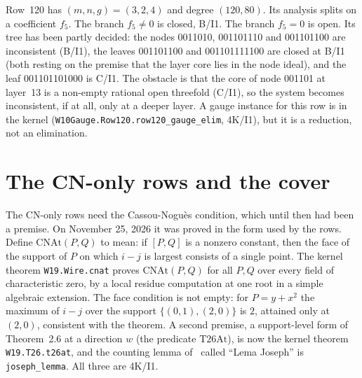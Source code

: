 \documentclass[a4paper,11pt]{article}
\theoremstyle{jsplain}
\theoremstyle{jsdef}
\theoremstyle{jsrem}
\begin{document}
Row~120 has $(m,n,g)=(3,2,4)$ and degree $(120,80)$. Its analysis splits on a coefficient $f_5$. The branch $f_5\ne0$ is closed, B/I1. The branch $f_5=0$ is open. Its tree has been partly decided: the nodes 0011010, 001101110 and 001101100 are inconsistent (B/I1), the leaves 001101100 and 001101111100 are closed at B/I1 (both resting on the premise that the layer core lies in the node ideal), and the leaf 001101101000 is C/I1. The obstacle is that the core of node 001101 at layer~13 is a non-empty rational open threefold (C/I1), so the system becomes inconsistent, if at all, only at a deeper layer. A gauge instance for this row is in the kernel (\texttt{W10Gauge.\allowbreak{}Row120.\allowbreak{}row120\_\allowbreak{}gauge\_\allowbreak{}elim}, 4K/I1), but it is a reduction, not an elimination.

\section{The CN-only rows and the cover}\label{rp:sec:w19}

The CN-only rows need the Cassou-Nogu\`es condition, which until then had been a premise. On November 25, 2026 it was proved in the form used by the rows. Define $\mathrm{CNAt}(P,Q)$ to mean: if $[P,Q]$ is a nonzero constant, then the face of the support of $P$ on which $i-j$ is largest consists of a single point. The kernel theorem \texttt{W19.\allowbreak{}Wire.\allowbreak{}cnat} proves $\mathrm{CNAt}(P,Q)$ for all $P,Q$ over every field of characteristic zero, by a local residue computation at one root in a simple algebraic extension. The face condition is not empty: for $P=y+x^2$ the maximum of $i-j$ over the support $\{(0,1),(2,0)\}$ is $2$, attained only at $(2,0)$, consistent with the theorem. A second premise, a support-level form of~\cite{GGV1} Theorem~2.6 at a direction $w$ (the predicate $\mathrm{T26At}$), is now the kernel theorem \texttt{W19.\allowbreak{}T26.\allowbreak{}t26at}, and the counting lemma of~\cite{GGV1} called ``Lema Joseph'' is \texttt{joseph\_\allowbreak{}lemma}. All three are 4K/I1.
\end{document}
